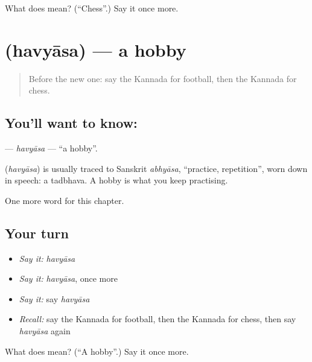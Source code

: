 \begin{tcolorbox}[breakable,colback=teal!4,colframe=teal!35!black,title={Before you move on}]
What does  mean? (\textquotedblleft{}Chess\textquotedblright{}.) Say it once more.
\end{tcolorbox}
\section[\texorpdfstring{\kn{ಹವ್ಯಾಸ} (havyāsa)}{ಹವ್ಯಾಸ (havyāsa)}]{ (havyāsa) — a hobby}

\label{lesson:KA-C228-havyasa}



\begin{quote}
Before the new one: say the Kannada for football, then the Kannada for chess.
\end{quote}

\subsection*{You'll want to know: }
\textbf{} — \emph{havyāsa} — \textquotedblleft{}a hobby\textquotedblright{}.

\begin{cousinweb}
\textbf{} (\emph{havyāsa}) is usually traced to Sanskrit \emph{abhyāsa}, \textquotedblleft{}practice, repetition\textquotedblright{}, worn down in speech: a tadbhava. A hobby is what you keep practising.
\end{cousinweb}

\begin{grammarlens}[title={What you've built}]
One more word for this chapter.
\end{grammarlens}

\subsection*{Your turn}
\begin{itemize}
\raggedright
  \item \emph{Say it:} \emph{havyāsa}
  \item \emph{Say it:} \emph{havyāsa}, once more
  \item \emph{Say it:} say \emph{havyāsa}
  \item \emph{Recall:} say the Kannada for football, then the Kannada for chess, then say \emph{havyāsa} again
\end{itemize}

\begin{tcolorbox}[breakable,colback=teal!4,colframe=teal!35!black,title={Before you move on}]
What does  mean? (\textquotedblleft{}A hobby\textquotedblright{}.) Say it once more.
\end{tcolorbox}
